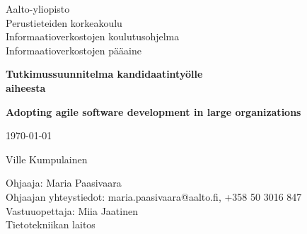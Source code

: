 \begin{titlepage}

	\begin{flushleft}
	\begin{minipage}{15cm}
		\linespread{1.0}\small
		Aalto-yliopisto \\
		Perustieteiden korkeakoulu \\
		Informaatioverkostojen koulutusohjelma \\
		Informaatioverkostojen pääaine
		\par
	\end{minipage}
	\end{flushleft}
	\centering
	\vspace{1.5cm}
	{\large\bfseries Tutkimussuunnitelma kandidaatintyölle \\ aiheesta \par}
	{\LARGE\bfseries Adopting agile software development in large organizations\par}
	\vspace{1.5cm}
	{\large \today\par}
	{\Large Ville Kumpulainen \par}
	\vfill

	\begin{flushleft}
	\begin{minipage}{15cm}
		\linespread{1.0}\small
		Ohjaaja: Maria Paasivaara\\
		Ohjaajan yhteystiedot: maria.paasivaara@aalto.fi, +358 50 3016 847 \\
		Vastuuopettaja: Miia Jaatinen \\
		Tietotekniikan laitos
		\par
	\end{minipage}
	\end{flushleft}


\end{titlepage}
